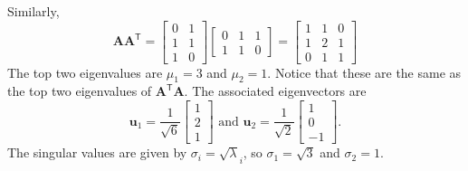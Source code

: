 Similarly, 
\[ 
\mathbf{A}\mathbf{A}^\mathsf{T}=\left[\begin{array}{rr}0&1\\1&1\\1&0\end{array}\right]
\left[\begin{array}{rrr}0&1&1\\1&1&0\end{array}\right]
=\left[\begin{array}{rrr}1&1&0\\1&2&1\\ 0&1&1\end{array}\right]
\]
The top two eigenvalues are $\mu_1 = 3$ and $\mu_2  = 1$.  Notice that these are the same as the top two eigenvalues of $\mathbf{A}^\mathsf{T}\mathbf{A}$.  The associated eigenvectors are 
\[ \mathbf{u}_1=\frac{1}{\sqrt{6}}\left[\begin{array}{r}1\\ 2\\ 1\end{array}\right] \mbox{ and } 
\mathbf{u}_2=\frac{1}{\sqrt{2}}\left[\begin{array}{r}1\\ 0\\ -1\end{array}\right].
\]
The singular values are given by $\sigma_i = \sqrt \lambda_i$, so $\sigma_1 = \sqrt 3$ and $\sigma_2 = 1$.

